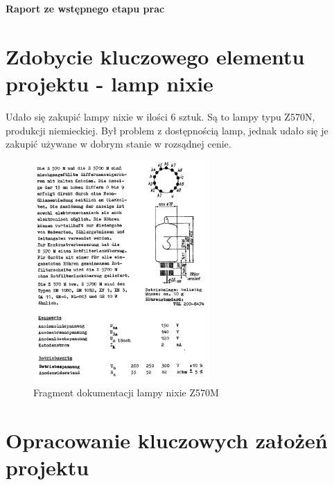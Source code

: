\documentclass{article}
\begin{document}
\begin{center}
  \begin{huge}
    \textbf{Raport ze wstępnego etapu prac}
  \end{huge}
\end{center}

\section{Zdobycie kluczowego elementu projektu - lamp nixie}
Udało się zakupić lampy nixie w ilości 6 sztuk. Są to lampy typu Z570N, produkcji niemieckiej.
Był problem z dostępnością lamp, jednak udało się je zakupić używane w dobrym stanie w rozsądnej cenie.

\begin{figure}[H]
    \centering
    \includegraphics[width=0.6\textwidth]{doc-lamp.png}
    \caption{Fragment dokumentacji lampy nixie Z570M}
\end{figure}

\section{Opracowanie kluczowych założeń projektu}
\end{document}
